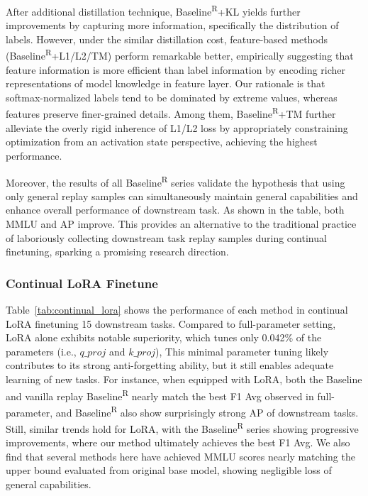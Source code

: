 After additional distillation technique, Baseline\textsuperscript{R}+KL yields further improvements by capturing more information, specifically the distribution of labels.
However, under the similar distillation cost, feature-based methods (Baseline\textsuperscript{R}+L1/L2/TM) perform remarkable better,
empirically suggesting that feature information is more efficient than label information by encoding richer representations of model knowledge in feature layer.
Our rationale is that softmax-normalized labels tend to be dominated by extreme values, whereas features preserve finer-grained details.
Among them, Baseline\textsuperscript{R}+TM further alleviate the overly rigid inherence of L1/L2 loss by appropriately constraining optimization from an activation state perspective, achieving the highest performance.

Moreover, the results of all Baseline\textsuperscript{R} series validate the hypothesis that using only general replay samples can simultaneously maintain general capabilities and enhance overall performance of downstream task. As shown in the table, both MMLU and AP improve.
This provides an alternative to the traditional practice of laboriously collecting downstream task replay samples during continual finetuning, sparking a promising research direction.


\subsubsection{Continual LoRA Finetune}
Table~\ref{tab:continual_lora} shows the performance of each method in continual LoRA finetuning 15 downstream tasks.
Compared to full-parameter setting, LoRA alone exhibits notable superiority, which tunes only 0.042\% of the parameters (i.e., $q\_proj$ and $k\_proj$), This minimal parameter tuning likely contributes to its strong anti-forgetting ability, but it still enables adequate learning of new tasks.
For instance, when equipped with LoRA, both the Baseline and vanilla replay Baseline\textsuperscript{R} nearly match the best F1 Avg observed in full-parameter, and Baseline\textsuperscript{R} also show surprisingly strong AP of downstream tasks.
Still, similar trends hold for LoRA, with the Baseline\textsuperscript{R} series showing progressive improvements, where our method ultimately achieves the best F1 Avg.
We also find that several methods here have achieved MMLU scores nearly matching the upper bound evaluated from original base model, showing negligible loss of general capabilities.

